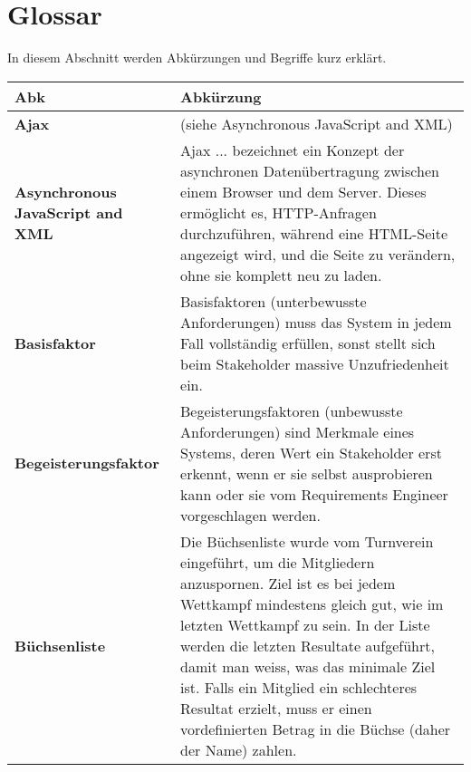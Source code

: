 %
%

\chapter*{Glossar}\label{chap.glossar}
\label{cha:glossar}

In diesem Abschnitt werden Abkürzungen und Begriffe kurz erklärt.

\begin{longtable}{|m{3cm}|m{11cm}|}\hline	
	\rowcolor{gray} \textbf{Abk}&
	Abkürzung \\ \hline		


	\textbf{Ajax}&
	(siehe Asynchronous JavaScript and XML)\\ \hline	

	\textbf{Asynchronous JavaScript and XML}&
	Ajax ... bezeichnet ein Konzept der asynchronen Datenübertragung zwischen einem Browser und dem Server. Dieses ermöglicht es, HTTP-Anfragen durchzuführen, während eine HTML-Seite angezeigt wird, und die Seite zu verändern, ohne sie komplett neu zu laden.\cite{wiki_ajax}\\ \hline	

	\textbf{Basisfaktor}&
	Basisfaktoren (unterbewusste Anforderungen) muss das System in jedem Fall vollständig erfüllen, sonst stellt sich beim Stakeholder massive Unzufriedenheit ein. \cite{req_eng_book}\\ \hline	

	\textbf{Begeisterungsfaktor}&
	Begeisterungsfaktoren (unbewusste Anforderungen) sind Merkmale eines Systems, deren Wert ein Stakeholder erst erkennt, wenn er sie selbst ausprobieren kann oder sie vom Requirements Engineer vorgeschlagen werden.\cite{req_eng_book}\\ \hline	

	\textbf{Büchsenliste}&
	Die Büchsenliste wurde vom Turnverein eingeführt, um die Mitgliedern anzuspornen. Ziel ist es bei jedem Wettkampf mindestens gleich gut, wie im letzten Wettkampf zu sein. In der Liste werden die letzten Resultate aufgeführt, damit man weiss, was das minimale Ziel ist. Falls ein Mitglied ein schlechteres Resultat erzielt, muss er einen vordefinierten Betrag in die Büchse (daher der Name) zahlen.\\ \hline	


\end{longtable}
